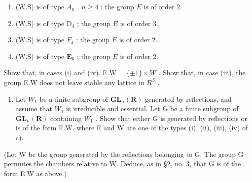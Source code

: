 \begin{enumerate}
\def\labelenumi{(\roman{enumi})}
\item
  (W.S) is of type \(A_{n}\) . \(n \geqslant 4\) : the group \(E\) is of order 2.
\item
  (W.S) is of type \(\mathrm{D}_4\) ; the group \(E\) is of order 3.
\item
  (W.S) is of type \(F_4\) ; the group \(E\) is of order 2.
\item
  (W.S) is of type \(\mathbf{E}_6\) ; the group \(E\) is of order 2.
\end{enumerate}

Show that, in cases (i) and (iv). E.W = \(\{\pm1\} \times W\) . Show that, in case (iii), the group E.W does not leave stable any lattice in \(R^{S}\) .

\begin{enumerate}
\def\labelenumi{\alph{enumi})}
\setcounter{enumi}{3}
\tightlist
\item
  Let \(W_{1}\) be a finite subgroup of \(\mathbf{GL}_{n}(\mathbf{R})\) generated by reflections, and assume that \(W_{1}\) is irreducible and essential. Let G be a finite subgroup of \(\mathbf{GL}_{n}(\mathbf{R})\) containing \(W_{1}\) . Show that either G is generated by reflections or is of the form E.W. where E and W are one of the types (i), (ii), (iii), (iv) of c).
\end{enumerate}

(Let W be the group generated by the reflections belonging to G. The group G permutes the chambers relative to W. Deduce, as in §2, no. 3, that G is of the form E.W as above.)
\relax{}
